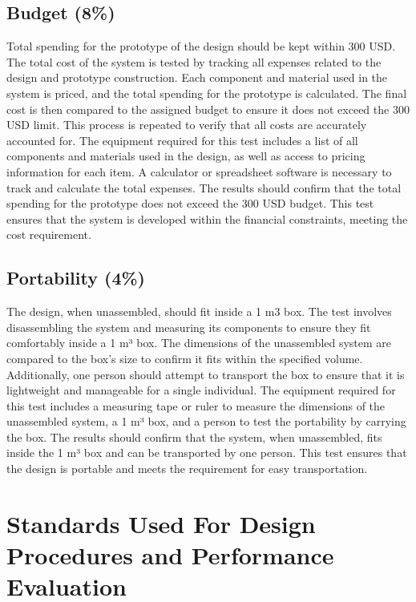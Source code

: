 \documentclass[12pt]{article}
\begin{document}
\subsection{Budget (8\%)}
Total spending for the prototype of the design should be kept within 300 USD. The total cost of the system is tested by tracking all expenses related to the design and prototype construction. Each component and material used in the system is priced, and the total spending for the prototype is calculated. The final cost is then compared to the assigned budget to ensure it does not exceed the 300 USD limit. This process is repeated to verify that all costs are accurately accounted for. The equipment required for this test includes a list of all components and materials used in the design, as well as access to pricing information for each item. A calculator or spreadsheet software is necessary to track and calculate the total expenses. The results should confirm that the total spending for the prototype does not exceed the 300 USD budget. This test ensures that the system is developed within the financial constraints, meeting the cost requirement.

\subsection{Portability (4\%)}
The design, when unassembled, should fit inside a 1 m3 box. The test involves disassembling the system and measuring its components to ensure they fit comfortably inside a 1 m³ box. The dimensions of the unassembled system are compared to the box's size to confirm it fits within the specified volume. Additionally, one person should attempt to transport the box to ensure that it is lightweight and manageable for a single individual. The equipment required for this test includes a measuring tape or ruler to measure the dimensions of the unassembled system, a 1 m³ box, and a person to test the portability by carrying the box. The results should confirm that the system, when unassembled, fits inside the 1 m³ box and can be transported by one person. This test ensures that the design is portable and meets the requirement for easy transportation.

\section{Standards Used For Design Procedures and Performance Evaluation }
\end{document}
